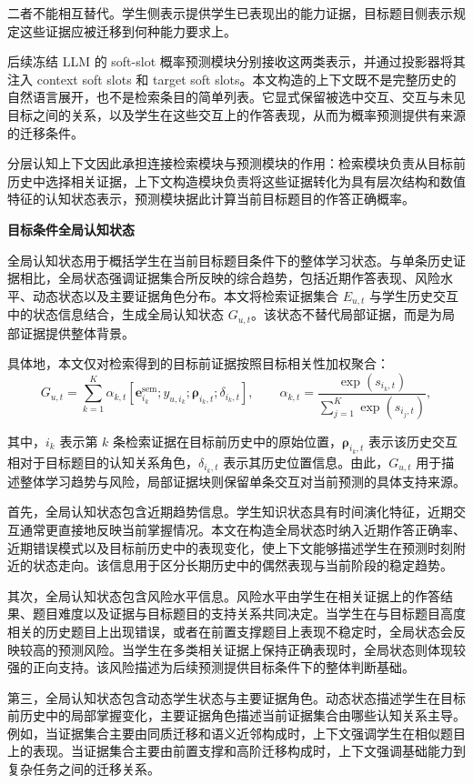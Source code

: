 \documentclass[UTF8,a4paper,12pt]{ctexart}
\numberwithin{table}{section}
\begin{document}
二者不能相互替代。学生侧表示提供学生已表现出的能力证据，目标题目侧表示规定这些证据应被迁移到何种能力要求上。



后续冻结 LLM 的 soft-slot 概率预测模块分别接收这两类表示，并通过投影器将其注入 context soft slots 和 target soft slots。本文构造的上下文既不是完整历史的自然语言展开，也不是检索条目的简单列表。它显式保留被选中交互、交互与未见目标之间的关系，以及学生在这些交互上的作答表现，从而为概率预测提供有来源的迁移条件。

分层认知上下文因此承担连接检索模块与预测模块的作用：检索模块负责从目标前历史中选择相关证据，上下文构造模块负责将这些证据转化为具有层次结构和数值特征的认知状态表示，预测模块据此计算当前目标题目的作答正确概率。

\noindent\textbf{目标条件全局认知状态}

全局认知状态用于概括学生在当前目标题目条件下的整体学习状态。与单条历史证据相比，全局状态强调证据集合所反映的综合趋势，包括近期作答表现、风险水平、动态状态以及主要证据角色分布。本文将检索证据集合 \(E_{u,t}\) 与学生历史交互中的状态信息结合，生成全局认知状态 \(G_{u,t}\)。该状态不替代局部证据，而是为局部证据提供整体背景。

具体地，本文仅对检索得到的目标前证据按照目标相关性加权聚合：
\[
{G_{u,t}=\sum_{k=1}^{K}\alpha_{k,t}\left[\mathbf e_{i_k}^{\mathrm{sem}};y_{u,i_k};\boldsymbol{\rho}_{i_k,t};\delta_{i_k,t}\right],\qquad \alpha_{k,t}=\frac{\exp(s_{i_k,t})}{\sum_{j=1}^{K}\exp(s_{i_j,t})},}
\]

其中，\(i_k\) 表示第 \(k\) 条检索证据在目标前历史中的原始位置，\(\boldsymbol{\rho}_{i_k,t}\) 表示该历史交互相对于目标题目的认知关系角色，\(\delta_{i_k,t}\) 表示其历史位置信息。由此，\(G_{u,t}\) 用于描述整体学习趋势与风险，局部证据块则保留单条交互对当前预测的具体支持来源。

首先，全局认知状态包含近期趋势信息。学生知识状态具有时间演化特征，近期交互通常更直接地反映当前掌握情况。本文在构造全局状态时纳入近期作答正确率、近期错误模式以及目标前历史中的表现变化，使上下文能够描述学生在预测时刻附近的状态走向。该信息用于区分长期历史中的偶然表现与当前阶段的稳定趋势。

其次，全局认知状态包含风险水平信息。风险水平由学生在相关证据上的作答结果、题目难度以及证据与目标题目的支持关系共同决定。当学生在与目标题目高度相关的历史题目上出现错误，或者在前置支撑题目上表现不稳定时，全局状态会反映较高的预测风险。当学生在多类相关证据上保持正确表现时，全局状态则体现较强的正向支持。该风险描述为后续预测提供目标条件下的整体判断基础。

第三，全局认知状态包含动态学生状态与主要证据角色。动态状态描述学生在目标前历史中的局部掌握变化，主要证据角色描述当前证据集合由哪些认知关系主导。例如，当证据集合主要由同质迁移和语义近邻构成时，上下文强调学生在相似题目上的表现。当证据集合主要由前置支撑和高阶迁移构成时，上下文强调基础能力到复杂任务之间的迁移关系。
\end{document}
